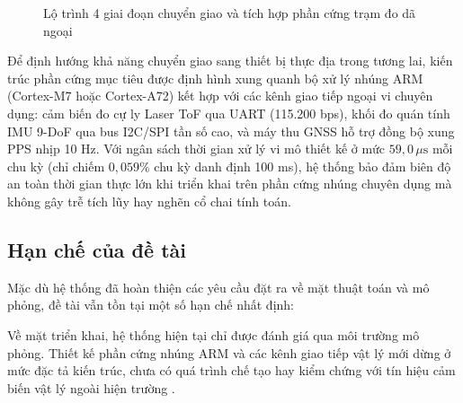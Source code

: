 \begin{figure}[H]
\centering
{}
\caption{Lộ trình 4 giai đoạn chuyển giao và tích hợp phần cứng trạm đo dã ngoại}
\label{fig:hardware-roadmap}
\end{figure}

Để định hướng khả năng chuyển giao sang thiết bị thực địa trong tương lai, kiến trúc phần cứng mục tiêu được định hình xung quanh bộ xử lý nhúng ARM (Cortex-M7 hoặc Cortex-A72) kết hợp với các kênh giao tiếp ngoại vi chuyên dụng: cảm biến đo cự ly Laser ToF qua UART (115.200 bps), khối đo quán tính IMU 9-DoF qua bus I2C/SPI tần số cao, và máy thu GNSS hỗ trợ đồng bộ xung PPS nhịp 10 Hz. Với ngân sách thời gian xử lý vi mô thiết kế ở mức $59{,}0\,\mu\text{s}$ mỗi chu kỳ (chỉ chiếm $0{,}059\%$ chu kỳ danh định 100 ms), hệ thống bảo đảm biên độ an toàn thời gian thực lớn khi triển khai trên phần cứng nhúng chuyên dụng mà không gây trễ tích lũy hay nghẽn cổ chai tính toán.


\subsection{Hạn chế của đề tài}

\hspace{0.5cm} Mặc dù hệ thống đã hoàn thiện các yêu cầu đặt ra về mặt thuật toán và mô phỏng, đề tài vẫn tồn tại một số hạn chế nhất định:

Về mặt triển khai, hệ thống hiện tại chỉ được đánh giá qua môi trường mô phỏng. Thiết kế phần cứng nhúng ARM và các kênh giao tiếp vật lý mới dừng ở mức đặc tả kiến trúc, chưa có quá trình chế tạo hay kiểm chứng với tín hiệu cảm biến vật lý ngoài hiện trường \cite{farrell2008aided}.

